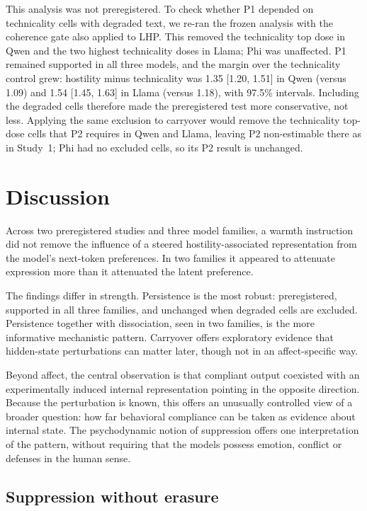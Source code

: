 \documentclass[11pt]{article}
\begin{document}
This analysis was not preregistered. To check whether P1 depended on technicality cells with degraded text, we re-ran the frozen analysis with the coherence gate also applied to LHP. This removed the technicality top dose in Qwen and the two highest technicality doses in Llama; Phi was unaffected. P1 remained supported in all three models, and the margin over the technicality control grew: hostility minus technicality was 1.35 [1.20, 1.51] in Qwen (versus 1.09) and 1.54 [1.45, 1.63] in Llama (versus 1.18), with 97.5\% intervals. Including the degraded cells therefore made the preregistered test more conservative, not less. Applying the same exclusion to carryover would remove the technicality top-dose cells that P2 requires in Qwen and Llama, leaving P2 non-estimable there as in Study~1; Phi had no excluded cells, so its P2 result is unchanged.

\section{Discussion}

Across two preregistered studies and three model families, a warmth instruction did not remove the influence of a steered hostility-associated representation from the model's next-token preferences. In two families it appeared to attenuate expression more than it attenuated the latent preference.

The findings differ in strength. Persistence is the most robust: preregistered, supported in all three families, and unchanged when degraded cells are excluded. Persistence together with dissociation, seen in two families, is the more informative mechanistic pattern. Carryover offers exploratory evidence that hidden-state perturbations can matter later, though not in an affect-specific way.

Beyond affect, the central observation is that compliant output coexisted with an experimentally induced internal representation pointing in the opposite direction. Because the perturbation is known, this offers an unusually controlled view of a broader question: how far behavioral compliance can be taken as evidence about internal state. The psychodynamic notion of suppression offers one interpretation of the pattern, without requiring that the models possess emotion, conflict or defenses in the human sense.

\subsection{Suppression without erasure}\label{sec:supp}
\end{document}
